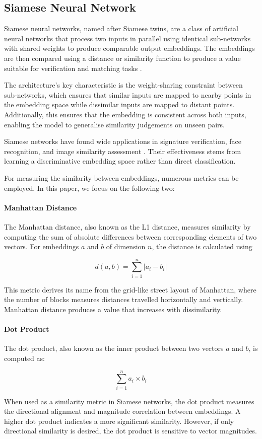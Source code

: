 \subsection{Siamese Neural Network}
Siamese neural networks, named after Siamese twins, are a class of artificial neural networks that process two inputs in parallel using identical sub-networks with shared weights to produce comparable output embeddings. The embeddings are then compared using a distance or similarity function to produce a value suitable for verification and matching tasks \cite{SiameseModelIntro}.

The architecture's key characteristic is the weight-sharing constraint between sub-networks, which ensures that similar inputs are mapped to nearby points in the embedding space while dissimilar inputs are mapped to distant points. Additionally, this ensures that the embedding is consistent across both inputs, enabling the model to generalise similarity judgements on unseen pairs.

Siamese networks have found wide applications in signature verification, face recognition, and image similarity assessment \cite{SiameseModelSignatureVerification, SiameseFacialRecognition, SiameseImageSimilarity} . Their effectiveness stems from learning a discriminative embedding space rather than direct classification.

For measuring the similarity between embeddings, numerous metrics can be employed. In this paper, we focus on the following two:

\paragraph{Manhattan Distance}
The Manhattan distance, also known as the L1 distance, measures similarity by computing the sum of absolute differences between corresponding elements of two vectors. For embeddings $a$ and $b$ of dimension $n$, the distance is calculated using

$$d(a, b) = \sum^n_{i=1}|a_i - b_i|$$

This metric derives its name from the grid-like street layout of Manhattan, where the number of blocks measures distances travelled horizontally and vertically. Manhattan distance produces a value that increases with dissimilarity.



\paragraph{Dot Product}
The dot product, also known as the inner product between two vectors $a$ and $b$, is computed as:

$$\sum^n_{i=1}a_i \times b_i$$

When used as a similarity metric in Siamese networks, the dot product measures the directional alignment and magnitude correlation between embeddings. A higher dot product indicates a more significant similarity. However, if only directional similarity is desired, the dot product is sensitive to vector magnitudes.


